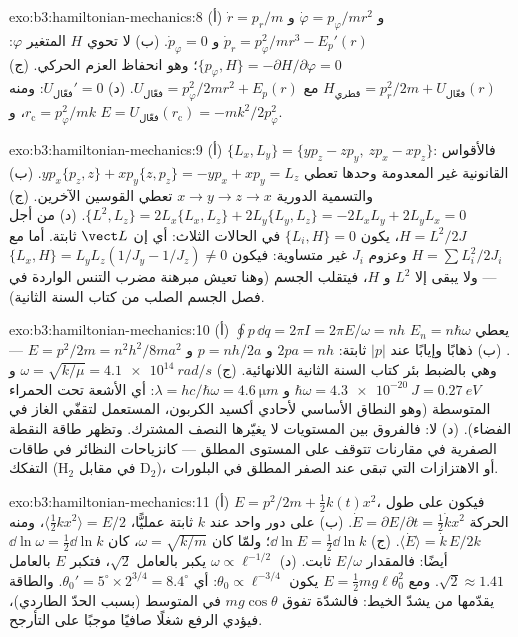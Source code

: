 \begin{solution}{exo:b3:hamiltonian-mechanics:8}
(أ) $\dot r = p_r/m$ و $\dot\varphi = p_\varphi/mr^2$ و $\dot p_r =
p_\varphi^2/mr^3 - E_p'(r)$ و $\dot p_\varphi = 0$. (ب) لا تحوي $H$
المتغير $\varphi$: $\{p_\varphi, H\} = -\partial H/\partial\varphi =
0$؛ وهو انحفاظ العزم الحركي. (ج) $H_{\text{قطري}} = p_r^2/2m +
U_{\text{فعّال}}(r)$ مع $U_{\text{فعّال}} = p_\varphi^2/2mr^2 + E_p(r)$.
(د) $U_{\text{فعّال}}' = 0$: ومنه $r_{\text{c}} = p_\varphi^2/mk$، و $E =
U_{\text{فعّال}}(r_{\text{c}}) = -mk^2/2p_\varphi^2$.
\end{solution}

\begin{solution}{exo:b3:hamiltonian-mechanics:9}
(أ) $\{L_x, L_y\} = \{yp_z - zp_y,\ zp_x - xp_z\}$: فالأقواس
القانونية غير المعدومة وحدها تعطي $yp_x\{p_z, z\} + xp_y\{z,
p_z\} = -yp_x + xp_y = L_z$. (ب) والتسمية الدورية $x \to y \to z \to
x$ تعطي القوسين الآخرين. (ج) $\{L^2, L_z\} = 2L_x\{L_x, L_z\} +
2L_y\{L_y, L_z\} = -2L_xL_y + 2L_yL_x = 0$. (د) من أجل $H = L^2/2J$،
يكون $\{L_i, H\} = 0$ في الحالات الثلاث: أي إن $\vect L$ ثابتة. أما مع $H = \sum L_i^2/2J_i$
وعزوم $J_i$ غير متساوية: فيكون $\{L_x, H\} = L_yL_z(1/J_y - 1/J_z) \neq 0$ ---
ولا يبقى إلا $L^2$ و $H$، فيتقلب الجسم (وهنا تعيش مبرهنة مضرب
التنس الواردة في فصل الجسم الصلب من كتاب السنة الثانية).
\end{solution}

\begin{solution}{exo:b3:hamiltonian-mechanics:10}
(أ) $\oint p\,\dd q = 2\pi I = 2\pi E/\omega = nh$ يعطي $E_n =
n\hbar\omega$. (ب) ذهابًا وإيابًا عند $|p|$ ثابتة: $2pa = nh$ و $p =
nh/2a$ و $E = p^2/2m = n^2h^2/8ma^2$ --- وهي بالضبط بئر
كتاب السنة الثانية اللانهائية. (ج) $\omega = \sqrt{k/\mu} = \qty{4.1e14}{rad/s}$
و $\hbar\omega = \qty{4.3e-20}{J} = \qty{0.27}{eV}$ و $\lambda = hc/
\hbar\omega = \qty{4.6}{\micro m}$: أي الأشعة تحت الحمراء المتوسطة
(وهو النطاق الأساسي لأحادي أكسيد الكربون، المستعمل لتقفّي الغاز
في الفضاء). (د) لا: فالفروق بين المستويات لا يغيّرها النصف
المشترك. وتظهر طاقة النقطة الصفرية في مقارنات تتوقف على المستوى
المطلق --- كانزياحات النظائر في طاقات التفكك (H$_2$ في مقابل
D$_2$)، أو الاهتزازات التي تبقى عند الصفر المطلق في البلورات.
\end{solution}

\begin{solution}{exo:b3:hamiltonian-mechanics:11}
(أ) $E = p^2/2m + \tfrac12 k(t)x^2$، فيكون على طول الحركة $\dot E =
\partial E/\partial t = \tfrac12\dot kx^2$. (ب) على دور واحد عند
$k$ ثابتة عمليًّا، $\langle\tfrac12 kx^2\rangle = E/2$، ومنه
$\langle\dot E\rangle = \dot k\,E/2k$. (ج) $\dd\ln E = \tfrac12\dd\ln
k$؛ ولمّا كان $\omega = \sqrt{k/m}$، كان $\dd\ln\omega = \tfrac12\dd\ln k$
أيضًا: فالمقدار $E/\omega$ ثابت. (د) $\omega \propto \ell^{-1/2}$ يكبر
بالعامل $\sqrt2$، فتكبر $E$ بالعامل $\sqrt2 \approx 1.41$. ومع $E = \tfrac12
mg\ell\theta_0^2$ يكون $\theta_0 \propto \ell^{-3/4}$: أي $\theta_0' =
5^\circ \times 2^{3/4} = 8.4^\circ$. والطاقة يقدّمها من يشدّ
الخيط: فالشدّة تفوق $mg\cos\theta$ في المتوسط (بسبب الحدّ
الطاردي)، فيؤدي الرفع شغلًا صافيًا موجبًا على التأرجح.
\end{solution}

